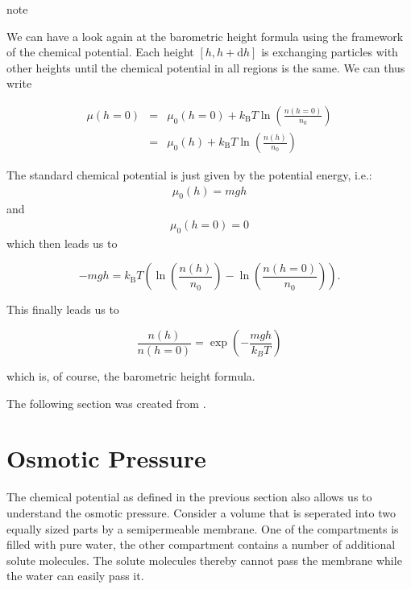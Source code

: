 \documentclass[letterpaper,10pt,english]{sphinxmanual}
\begin{document}
\begin{sphinxadmonition}{note}{}\unskip
\sphinxAtStartPar
{}

\sphinxAtStartPar
We can have a look again at the barometric height formula using the framework of the chemical potential. Each height \([h,h+\mathrm{d}h]\) is exchanging particles with other heights until the chemical potential in all regions is the same. We can thus write

\sphinxAtStartPar
\begin{eqnarray}
\mu(h=0)&=&\mu_{0}(h=0)+k_\mathrm{B} T\ln \left ( \frac{n(h=0)}{n_0}\right )\\
&=&\mu_{0}(h)+k_\mathrm{B} T \ln \left ( \frac{n(h)}{n_0}\right )
\end{eqnarray}

\sphinxAtStartPar
The standard chemical potential is just given by the potential energy, i.e.:
\begin{equation*}
\begin{split}\mu_{0}(h)=mgh\end{split}
\end{equation*}
\sphinxAtStartPar
and
\begin{equation*}
\begin{split}\mu_{0}(h=0)=0\end{split}
\end{equation*}
\sphinxAtStartPar
which then leads us to

\sphinxAtStartPar
\begin{equation}
-mgh=k_\mathrm{B} T\left ( \ln \left( \frac{n(h)}{n_0} \right )    -\ln \left( \frac{n(h=0)}{n_0} \right ) \right).
\end{equation}

\sphinxAtStartPar
This finally leads us to

\sphinxAtStartPar
\begin{equation}
\frac{n(h)}{n(h=0)}=\exp\left (-\frac{mgh}{k_B T} \right )
\end{equation}

\sphinxAtStartPar
which is, of course, the barometric height formula.
\end{sphinxadmonition}



\sphinxAtStartPar
The following section was created from .


\chapter{Osmotic Pressure}
\label{\detokenize{notebooks/L4/1_Osmotic_Pressure:Osmotic-Pressure}}\label{\detokenize{notebooks/L4/1_Osmotic_Pressure::doc}}
\sphinxAtStartPar
The chemical potential as defined in the previous section also allows us to understand the osmotic pressure. Consider a volume that is seperated into two equally sized parts by a semipermeable membrane. One of the compartments is filled with pure water, the other compartment contains a number of additional solute molecules. The solute molecules thereby cannot pass the membrane while the water can easily pass it.
\end{document}
